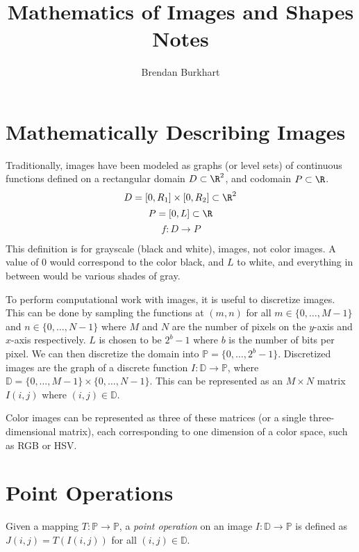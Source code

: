 \documentclass[12pt]{article}
\begin{document}
\title{Mathematics of Images and Shapes Notes}
\author{Brendan Burkhart}
\maketitle

\tableofcontents
\newpage

\section{Mathematically Describing Images}

Traditionally, images have been modeled as graphs (or level sets) of continuous functions defined on a rectangular domain $D \subset \R^2$, and codomain $P \subset \R$. \[D = \left[0, R_1\right] \times \left[0, R_2\right] \subset \R^2\] \[P = \left[0, L\right] \subset \R\] \[f : D \to P\]

This definition is for grayscale (black and white), images, not color images. A value of $0$ would correspond to the color black, and $L$ to white, and everything in between would be various shades of gray.

To perform computational work with images, it is useful to discretize images. This can be done by sampling the functions at $(m, n)$ for all $m \in \{0, \ldots, M-1\}$ and $n \in \{0, \ldots, N-1\}$ where $M$ and $N$ are the number of pixels on the $y$-axis and $x$-axis respectively. $L$ is chosen to be $2^b-1$ where $b$ is the number of bits per pixel. We can then discretize the domain into $\mathbb{P} = \{0, \ldots, 2^b-1\}$. Discretized images are the graph of a discrete function $I: \mathbb{D} \to \mathbb{P}$, where $\mathbb{D} = \{0, \ldots, M-1\} \times \{0, \ldots, N-1\}$. This can be represented as an $M \times N$ matrix $I(i, j)$ where $(i, j) \in \mathbb{D}$.

Color images can be represented as three of these matrices (or a single three-dimensional matrix), each corresponding to one dimension of a color space, such as RGB or HSV.

\section{Point Operations}

\begin{defn}
    Given a mapping $T: \mathbb{P} \to \mathbb{P}$, a \emph{point operation} on an image $I: \mathbb{D} \to \mathbb{P}$ is defined as $J(i, j) = T(I(i, j))$ for all $(i, j) \in \mathbb{D}$.
\end{defn}
\end{document}
